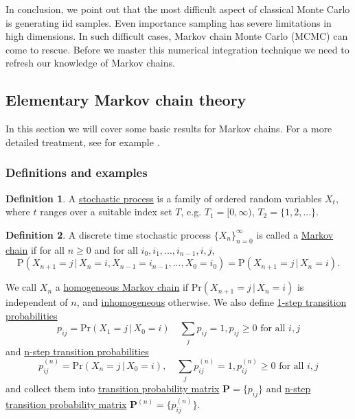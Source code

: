 \documentclass[11pt]{article}\usepackage[]{graphicx}\usepackage[]{color}
\numberwithin{algorithm}{section}
\newcommand{\cprob}[2]{\ensuremath{\text{Pr}\left(#1 \,|\,#2\right)}}
\theoremstyle{remark}
\theoremstyle{definition}
\newtheorem*{define}{Definition}
\begin{document}
In conclusion, we point out that the most difficult aspect of classical Monte Carlo is generating
iid samples. Even importance sampling has severe limitations in high dimensions. In such difficult 
cases, Markov chain Monte Carlo (MCMC) can come to rescue. Before we master this numerical integration
technique we need to refresh our knowledge of Markov chains.


\subsection{Elementary Markov chain theory}
In this section we will cover some basic results for Markov chains. For a more detailed treatment, see for example
\citep{BremaudBook}.

\subsubsection{Definitions and examples}

\begin{define}
A \underline{stochastic process} is a family of ordered random variables $X_t$, where $t$
ranges over a suitable index set $T$, e.g. $T_1 = [0, \infty)$, $T_2 =
\{1,2,...\}$.
\end{define}

\begin{define}
  A discrete time stochastic process $\{X_n\}_{n=0}^\infty$ is
  called a \underline{Markov chain} if for all $n \ge 0$ and for all 
  $i_0, i_1, ..., i_{n-1}, i, j$,
  \begin{equation*}
    \text{P}(X_{n+1} = j\,|\, X_n = i, X_{n-1} = i_{n-1}, ..., X_0 = i_0) = 
    \text{P}(X_{n + 1} = j \,|\, X_n = i).
  \end{equation*}

\noindent
We call $X_n$ a \underline{homogeneous Markov chain} if $\cprob{X_{n+1} = j}{X_n = i}$ 
is independent of $n$, and \underline{inhomogeneous} otherwise.
We also define \underline{1-step transition probabilities}
\begin{equation*}
  p_{ij} = \cprob{X_1 = j }{X_0 = i} \quad \sum_j p_{ij} = 1, p_{ij} \ge 0 \text{ for all } i,j
\end{equation*}
and \underline{n-step transition probabilities}
\begin{equation*}
  p_{ij}^{(n)} = \cprob{X_{n} = j}{X_0 = i}, \quad \sum_j p_{ij}^{(n)} = 1, 
  p_{ij}^{(n)} \ge 0 \text{ for all } i,j
\end{equation*}
and collect them into \underline{transition probability matrix} $\mathbf{P} = \{p_{ij}\}$
and \underline{n-step transition probability matrix} $\mathbf{P}^{(n)} = \{p_{ij}^{(n)}\}$.
\end{define}
\end{document}
